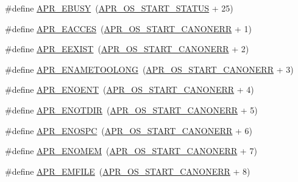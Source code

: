 \begin{DoxyCompactItemize}
\item 
\#define \hyperlink{group__APR__Error_gab6e5bc99dbace4a91d8d0adcbd8fd66b}{A\+P\+R\+\_\+\+E\+B\+U\+SY}~(\hyperlink{group__apr__errno_ga450e1a5734732e092ddaa5b67414f69b}{A\+P\+R\+\_\+\+O\+S\+\_\+\+S\+T\+A\+R\+T\+\_\+\+S\+T\+A\+T\+US} + 25)
\item 
\#define \hyperlink{group__APR__Error_ga407fc0ea7ead60f7a97fb9d70061bd41}{A\+P\+R\+\_\+\+E\+A\+C\+C\+ES}~(\hyperlink{group__apr__errno_ga7bca957c11b80b31cb54b0d2cbe9e025}{A\+P\+R\+\_\+\+O\+S\+\_\+\+S\+T\+A\+R\+T\+\_\+\+C\+A\+N\+O\+N\+E\+RR} + 1)
\item 
\#define \hyperlink{group__APR__Error_gafa7f353804388017a0ea71bc14f0dda5}{A\+P\+R\+\_\+\+E\+E\+X\+I\+ST}~(\hyperlink{group__apr__errno_ga7bca957c11b80b31cb54b0d2cbe9e025}{A\+P\+R\+\_\+\+O\+S\+\_\+\+S\+T\+A\+R\+T\+\_\+\+C\+A\+N\+O\+N\+E\+RR} + 2)
\item 
\#define \hyperlink{group__APR__Error_ga3db63b16c2b332efe441e2661f593377}{A\+P\+R\+\_\+\+E\+N\+A\+M\+E\+T\+O\+O\+L\+O\+NG}~(\hyperlink{group__apr__errno_ga7bca957c11b80b31cb54b0d2cbe9e025}{A\+P\+R\+\_\+\+O\+S\+\_\+\+S\+T\+A\+R\+T\+\_\+\+C\+A\+N\+O\+N\+E\+RR} + 3)
\item 
\#define \hyperlink{group__APR__Error_gacc26a4afe01b6cc141f839be71fddf1c}{A\+P\+R\+\_\+\+E\+N\+O\+E\+NT}~(\hyperlink{group__apr__errno_ga7bca957c11b80b31cb54b0d2cbe9e025}{A\+P\+R\+\_\+\+O\+S\+\_\+\+S\+T\+A\+R\+T\+\_\+\+C\+A\+N\+O\+N\+E\+RR} + 4)
\item 
\#define \hyperlink{group__APR__Error_gacfaa73cea75d14d49cc5c81e6c494330}{A\+P\+R\+\_\+\+E\+N\+O\+T\+D\+IR}~(\hyperlink{group__apr__errno_ga7bca957c11b80b31cb54b0d2cbe9e025}{A\+P\+R\+\_\+\+O\+S\+\_\+\+S\+T\+A\+R\+T\+\_\+\+C\+A\+N\+O\+N\+E\+RR} + 5)
\item 
\#define \hyperlink{group__APR__Error_ga1dfc0bbf080f17b0b9010ef967542193}{A\+P\+R\+\_\+\+E\+N\+O\+S\+PC}~(\hyperlink{group__apr__errno_ga7bca957c11b80b31cb54b0d2cbe9e025}{A\+P\+R\+\_\+\+O\+S\+\_\+\+S\+T\+A\+R\+T\+\_\+\+C\+A\+N\+O\+N\+E\+RR} + 6)
\item 
\#define \hyperlink{group__APR__Error_ga6a453e60000000609a95817efabebf4f}{A\+P\+R\+\_\+\+E\+N\+O\+M\+EM}~(\hyperlink{group__apr__errno_ga7bca957c11b80b31cb54b0d2cbe9e025}{A\+P\+R\+\_\+\+O\+S\+\_\+\+S\+T\+A\+R\+T\+\_\+\+C\+A\+N\+O\+N\+E\+RR} + 7)
\item 
\#define \hyperlink{group__APR__Error_gaec391eaf0bfa6aed03457ed3f796942d}{A\+P\+R\+\_\+\+E\+M\+F\+I\+LE}~(\hyperlink{group__apr__errno_ga7bca957c11b80b31cb54b0d2cbe9e025}{A\+P\+R\+\_\+\+O\+S\+\_\+\+S\+T\+A\+R\+T\+\_\+\+C\+A\+N\+O\+N\+E\+RR} + 8)

\end{DoxyCompactItemize}

